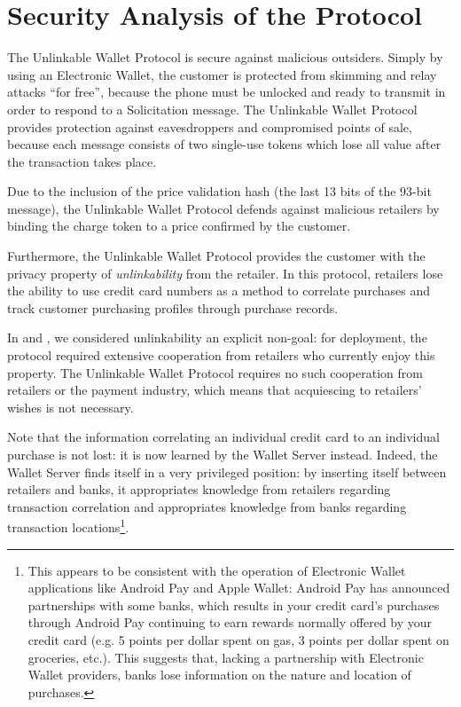 \section{Security Analysis of the Protocol}
\label{sec:analysis}

The Unlinkable Wallet Protocol is secure against malicious outsiders.
Simply by using an Electronic Wallet, the customer is protected from skimming and relay attacks ``for free'',
    because the phone must be unlocked and ready to transmit in order to respond to a Solicitation message.
The Unlinkable Wallet Protocol provides protection against eavesdroppers and compromised points of sale,
    because each message consists of two single-use tokens which lose all value after the transaction takes place.

Due to the inclusion of the price validation hash (the last 13 bits of the 93-bit message),
    the Unlinkable Wallet Protocol defends against malicious retailers by binding the charge token to a price confirmed by the customer.

Furthermore, the Unlinkable Wallet Protocol provides the customer with the privacy property of \emph{unlinkability} from the retailer.
In this protocol, retailers lose the ability to use credit card numbers as a method to correlate purchases and track customer purchasing profiles through purchase records.

In \cite{jensen1} and \cite{jensen2}, we considered unlinkability an explicit non-goal:
  for deployment, the protocol required extensive cooperation from retailers who currently enjoy this property.
The Unlinkable Wallet Protocol requires no such cooperation from retailers or the payment industry,
    which means that acquiescing to retailers' wishes is not necessary.

Note that the information correlating an individual credit card to an individual purchase is not lost:
    it is now learned by the Wallet Server instead.
Indeed, the Wallet Server finds itself in a very privileged position:
    by inserting itself between retailers and banks, it appropriates knowledge from retailers regarding transaction correlation
    and appropriates knowledge from banks regarding transaction locations\footnote{
This appears to be consistent with the operation of Electronic Wallet applications like Android Pay and Apple Wallet:
    Android Pay has announced partnerships with some banks,
    which results in your credit card's purchases through Android Pay continuing to earn rewards normally offered by your credit card
    (e.g. 5 points per dollar spent on gas, 3 points per dollar spent on groceries, etc.).
    This suggests that, lacking a partnership with Electronic Wallet providers, banks lose information on the nature and location of purchases.}.

